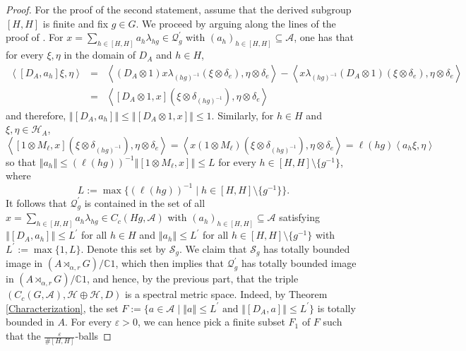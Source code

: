 \documentclass[a4paper,11pt,reqno]{amsart}
\numberwithin{equation}{section}
\numberwithin{equation}{section}
\theoremstyle{definition}
\theoremstyle{remark}
\theoremstyle{remark}
\begin{document}
\begin{proof}
For the proof of the second statement, assume that the derived subgroup
$[H,H]$ is finite and fix $g\in G$. We proceed by arguing along
the lines of the proof of \cite[Theorem 2.11]{HSWZ13}. For $x=\sum_{h\in[H,H]}a_{h}\lambda_{hg}\in\mathcal{Q}_{g}^{\prime}$
with $(a_{h})_{h\in[H,H]}\subseteq\mathcal{A}$, one has that for every
$\xi,\eta$ in the domain of $D_{A}$ and $h\in H$, 
\begin{eqnarray*}
\left\langle [D_{A},a_{h}]\xi,\eta\right\rangle  & = & \left\langle (D_{A}\otimes1)x\lambda_{(hg)^{-1}}(\xi\otimes\delta_{e}),\eta\otimes\delta_{e}\right\rangle -\left\langle x\lambda_{(hg)^{-1}}(D_{A}\otimes1)(\xi\otimes\delta_{e}),\eta\otimes\delta_{e}\right\rangle \\
 & = & \left\langle [D_{A}\otimes1,x](\xi\otimes\delta_{(hg)^{-1}}),\eta\otimes\delta_{e}\right\rangle 
\end{eqnarray*}
and therefore, $\left\Vert [D_{A},a_{h}]\right\Vert \leq\left\Vert [D_{A}\otimes1,x]\right\Vert \leq1$.
Similarly, for $h\in H$ and $\xi,\eta\in\mathcal{H}_{A}$, 
\[
\left\langle [1\otimes M_{\ell},x](\xi\otimes\delta_{(hg)^{-1}}),\eta\otimes\delta_{e}\right\rangle =\left\langle x(1\otimes M_{\ell})(\xi\otimes\delta_{(hg)^{-1}}),\eta\otimes\delta_{e}\right\rangle =\ell(hg)\left\langle a_{h}\xi,\eta\right\rangle 
\]
so that $\left\Vert a_{h}\right\Vert \leq(\ell(hg))^{-1}\left\Vert [1\otimes M_{\ell},x]\right\Vert \leq L$
for every $h\in[H,H]\setminus\{g^{-1}\}$, where
\[
L:=\max\{(\ell(hg))^{-1}\mid h\in[H,H]\setminus\{g^{-1}\}\}.
\]
It follows that $\mathcal{Q}_{g}^{\prime}$
is contained in the set of all $x=\sum_{h\in[H,H]}a_{h}\lambda_{hg}\in C_{c}(Hg,\mathcal{A})$
with $(a_{h})_{h\in[H,H]}\subseteq\mathcal{A}$ satisfying $\left\Vert [D_{A},a_{h}]\right\Vert \leq L^\prime$
for all $h\in H$ and $\left\Vert a_{h}\right\Vert \leq L^\prime$ for all
$h\in[H,H]\setminus\{g^{-1}\}$ with $L^{\prime}:=\max\{1,L\}$. Denote this set by $\mathcal{S}_{g}$.
We claim that $\mathcal{S}_{g}$ has totally bounded image in $(A\rtimes_{\alpha,r}G)/\mathbb{C}1$,
which then implies that $\mathcal{Q}_{g}^{\prime}$ has totally bounded
image in $(A\rtimes_{\alpha,r}G)/\mathbb{C}1$, and hence, by the previous
part, that the triple $(C_{c}(G,\mathcal{A}),\mathcal{H}\oplus\mathcal{H},D)$
is a spectral metric space. Indeed, by Theorem \ref{Characterization},
the set $F:=\{a\in\mathcal{A}\mid\left\Vert a\right\Vert \leq L^\prime \text{ and }\left\Vert [D_{A},a]\right\Vert \leq L^\prime\}$
is totally bounded in $A$. For every $\varepsilon>0$, we can hence
pick a finite subset $F_{1}$ of $F$ such that the $\frac{\varepsilon}{\#[H,H]}$-balls

\end{proof}
\end{document}
